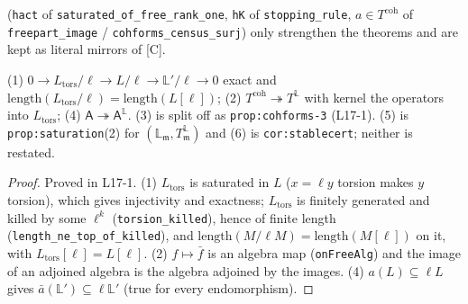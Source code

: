 (\texttt{hact} of \texttt{saturated\_of\_free\_rank\_one}, \texttt{hK} of \texttt{stopping\_rule}, $a\in T^{\mathrm{coh}}$ of
\texttt{freepart\_image} / \texttt{cohforms\_census\_surj}) only strengthen the theorems and are kept as literal mirrors of [C].

\begin{proposition}\label{prop:cohforms}
  \leanok
  (1) $0\to L_{\mathrm{tors}}/\ell\to L/\ell\to\mathbb L'/\ell\to0$ exact and $\mathrm{length}(L_{\mathrm{tors}}/\ell)=\mathrm{length}(L[\ell])$;
  (2) $T^{\mathrm{coh}}\twoheadrightarrow T^{\mathbb L}$ with kernel the operators into $L_{\mathrm{tors}}$; (4) $\mathsf A\twoheadrightarrow
  \mathsf A^{\mathbb L}$. (3) is split off as \texttt{prop:cohforms-3} (L17-1). (5) is \texttt{prop:saturation}(2) for
  $(\mathbb L_{\mathfrak m},T^{\mathbb L}_{\mathfrak m})$ and (6) is \texttt{cor:stablecert}; neither is restated.
\end{proposition}
\begin{proof}
  \leanok
  Proved in L17-1. (1) $L_{\mathrm{tors}}$ is saturated in $L$ ($x=\ell y$ torsion makes $y$ torsion), which gives injectivity and
  exactness; $L_{\mathrm{tors}}$ is finitely generated and killed by some $\ell^k$ (\texttt{torsion\_killed}), hence of finite length
  (\texttt{length\_ne\_top\_of\_killed}), and $\mathrm{length}(M/\ell M)=\mathrm{length}(M[\ell])$ on it, with $L_{\mathrm{tors}}[\ell]=L[\ell]$.
  (2) $f\mapsto\bar f$ is an algebra map (\texttt{onFreeAlg}) and the image of an adjoined algebra is the algebra adjoined by the
  images. (4) $a(L)\subseteq\ell L$ gives $\bar a(\mathbb L')\subseteq\ell\mathbb L'$ (true for every endomorphism).
\end{proof}


